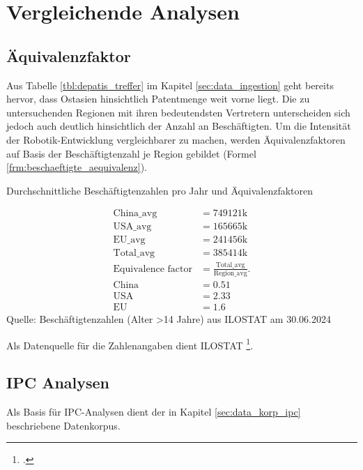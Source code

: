 \newpage
\section{Vergleichende Analysen}\label{sec:analysis}

\subsection{Äquivalenzfaktor}\label{sec:aquiv_fakt}

Aus Tabelle \ref{tbl:depatis_treffer} im Kapitel \ref{sec:data_ingestion} geht bereits hervor, dass Ostasien hinsichtlich Patentmenge weit vorne liegt. Die zu untersuchenden Regionen mit ihren bedeutendsten Vertretern unterscheiden sich jedoch auch deutlich hinsichtlich der Anzahl an Beschäftigten. Um die Intensität der Robotik-Entwicklung vergleichbarer zu machen, werden Äquivalenzfaktoren auf Basis der Beschäftigtenzahl je Region gebildet (Formel \ref{frm:beschaeftigte_aequivalenz}).
\begin{formel}[h]
	\caption{Durchschnittliche Beschäftigtenzahlen pro Jahr und Äquivalenzfaktoren}
	\label{frm:beschaeftigte_aequivalenz}
	\begin{align}
\text{China\_avg} &= 749121\text{k} \\
\text{USA\_avg} &= 165665\text{k} \\
\text{EU\_avg} &= 241456\text{k} \\
\text{Total\_avg} &= 385414\text{k} \\
\text{Equivalence factor} &= \frac{\text{Total\_avg}}{\text{Region\_avg}} \text{.} \\
\text{China} &= 0.51 \\
\text{USA} &= 2.33 \\
\text{EU} &= 1.6
	\end{align}
	\vspace{0.5em}
	\normalsize{Quelle: Beschäftigtenzahlen (Alter >14 Jahre) aus ILOSTAT am 30.06.2024}
	\vspace{-1.0em}
\end{formel}
Als Datenquelle für die Zahlenangaben dient \Ac{ILOSTAT} \footcite{website:ilostat}.

\subsection{\ac{IPC} Analysen}\label{sec:ipc_analysis}

Als Basis für \ac{IPC}-Analysen dient der in Kapitel \ref{sec:data_korp_ipc} beschriebene Datenkorpus. 

